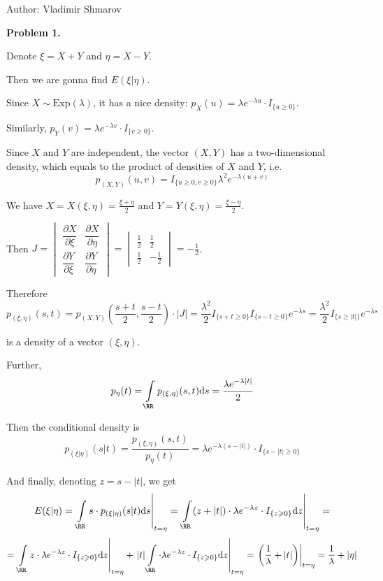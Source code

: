 \documentclass[12pt, a4paper]{article}
\newcommand{\ds}{\displaystyle}
\newcommand{\dz}{\mathrm{d}z}
\begin{document}
Author: Vladimir Shmarov


\textbf{Problem 1.}\par
Denote $\xi = X + Y$ and $\eta = X - Y$.\par
Then we are gonna find  $E(\xi| \eta)$.\par
Since $X \sim \mathrm{Exp}(\lambda)$, it has a nice density: $p_{X}(u) = \lambda e^{-\lambda u}\cdot I_{\{u \geqslant 0\}}$.\par
Similarly, $p_{Y}(v) =  \lambda e^{-\lambda v}\cdot I_{\{v \geqslant 0\}}$.\par
Since $X$ and $Y$ are independent, the vector $(X,Y)$ has a two-dimensional density, which equals to the product of densities of $X$ and $Y$, i.e.
$$
p_{(X,Y)}(u,v) = I_{\{u\geqslant 0, v\geqslant 0\}}\lambda^{2}e^{-\lambda(u+v)}
$$\par
We have $X = X(\xi, \eta) = \frac{\ds \xi + \eta}{\ds 2}$ and $Y = Y(\xi, \eta) = \frac{\ds \xi - \eta}{\ds 2}$.\par
Then $J = \begin{vmatrix}\dfrac{\ds \partial X}{\ds \partial \xi} & \dfrac{\ds \partial X}{\ds \partial \eta}\\ \dfrac{\ds \partial Y}{\ds \partial \xi}& \dfrac{\ds \partial Y}{\ds \partial \eta}
\end{vmatrix} = \begin{vmatrix}\frac{\ds 1}{\ds 2} & \frac{\ds 1}{\ds 2}\\ \frac{\ds 1}{\ds 2}& -\frac{\ds 1}{\ds 2}
\end{vmatrix} = - \frac{\ds 1}{\ds 2}$.\par
Therefore
$$
p_{(\xi, \eta)}(s,t) = p_{(X,Y)}\left(\frac{\ds s+t}{\ds 2}, \frac{\ds s-t}{\ds 2}\right)\cdot |J| = \frac{\ds \lambda^{2}}{\ds 2}I_{\{ s + t \geqslant 0\}}I_{\{s - t \geqslant 0\}}e^{-\lambda s} = \frac{\ds \lambda^{2}}{\ds 2}I_{\{ s \geqslant |t|\}}e^{-\lambda s}
$$
\par
is a density of a vector $(\xi, \eta)$.\par
Further,
$$
p_{\eta}(t) = \int\limits_{\RR}p_{(\xi, \eta)}(s,t)\mathrm{d}s = \frac{\ds \lambda e^{-\lambda|t|}}{\ds 2}
$$\par
Then the conditional density is
$$
p_{(\xi | \eta)}(s|t) = \frac{\ds p_{(\xi, \eta)}(s,t)}{\ds p_{\eta}(t)} = \lambda e^{-\lambda(s-|t|)}\cdot I_{\{s - |t|\geqslant 0\}}
$$\par
And finally, denoting $z = s - |t|$, we get
$$
E(\xi|\eta) = \left.\int\limits_{\RR}s\cdot p_{(\xi|\eta)}(s|t)\mathrm{d}s\right|_{t = \eta} = \left.\int\limits_{\RR}(z + |t|)\cdot\lambda e^{-\lambda z}\cdot I_{\{z\geqslant 0\}}\dz\right|_{t = \eta}  = $$  $$= \left.\int\limits_{\RR}z\cdot\lambda e^{-\lambda z}\cdot I_{\{z\geqslant 0\}}\dz\right|_{t = \eta} + \left.|t|\int\limits_{\RR}\cdot\lambda e^{-\lambda z}\cdot I_{\{z\geqslant 0\}}\dz\right|_{t = \eta} =  \left.\left(\frac{\ds 1}{\ds \lambda} + |t|\right)\right|_{t = \eta} = \frac{\ds 1}{\ds \lambda} + |\eta|
$$\par
\end{document}

